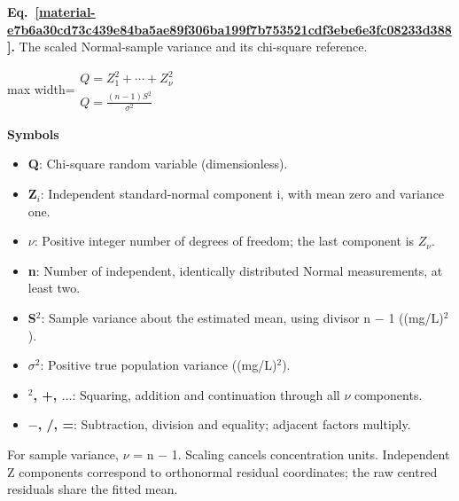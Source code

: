 \documentclass[11pt,a4paper]{article}
\begin{document}
\par\medskip
\noindent\begin{minipage}{\linewidth}
\label{material-e7b6a30cd73c439e84ba5ae89f306ba199f7b753521cdf3ebe6e3fc08233d388}
\noindent\textbf{Eq.~\ref*{material-e7b6a30cd73c439e84ba5ae89f306ba199f7b753521cdf3ebe6e3fc08233d388}.} The scaled Normal-sample variance and its chi-square reference.\par\nopagebreak
\begin{center}\begin{adjustbox}{max width=\linewidth}$\displaystyle \begin{gathered}Q=Z_1^2+\cdots+Z_\nu^2\\Q=\frac{(n-1)S^2}{\sigma^2}\end{gathered}$\end{adjustbox}\end{center}

\par\noindent\textbf{Symbols}

\begin{itemize}\setlength{\itemsep}{1pt}\setlength{\parsep}{0pt}
\item \textbf{Q}: Chi-square random variable (dimensionless).
\item \textbf{Z\ensuremath{{}_i}}: Independent standard-normal component i, with mean zero and variance one.
\item \textbf{\(ν\)}: Positive integer number of degrees of freedom; the last component is \(Z_ν\).
\item \textbf{n}: Number of independent, identically distributed Normal measurements, at least two.
\item \textbf{S\ensuremath{{}^2}}: Sample variance about the estimated mean, using divisor n \ensuremath{-} 1 ((mg/L)\ensuremath{{}^2}).
\item \textbf{\ensuremath{\sigma}\ensuremath{{}^2}}: Positive true population variance ((mg/L)\ensuremath{{}^2}).
\item \textbf{\ensuremath{{}^2}, +, \ensuremath{\ldots}}: Squaring, addition and continuation through all \ensuremath{\nu} components.
\item \textbf{\ensuremath{-}, /, =}: Subtraction, division and equality; adjacent factors multiply.
\end{itemize}

For sample variance, \ensuremath{\nu} = n \ensuremath{-} 1. Scaling cancels concentration units. Independent Z components correspond to orthonormal residual coordinates; the raw centred residuals share the fitted mean.

\end{minipage}\par
\medskip
\end{document}
